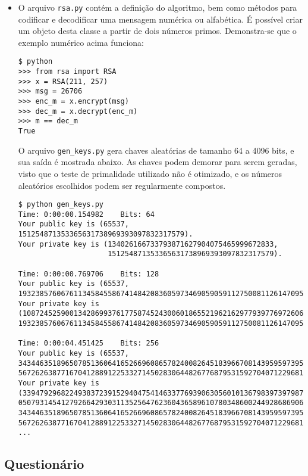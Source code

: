 \documentclass{article}
\begin{document}
\begin{itemize}
\item O arquivo \texttt{rsa.py} contém a definição do algoritmo, bem como
métodos para codificar e decodificar uma mensagem numérica ou alfabética. É
possível criar um objeto desta classe a partir de dois números primos.
Demonstra-se que o exemplo numérico acima funciona:
\begin{verbatim}
$ python
>>> from rsa import RSA
>>> x = RSA(211, 257)
>>> msg = 26706
>>> enc_m = x.encrypt(msg)
>>> dec_m = x.decrypt(enc_m)
>>> m == dec_m
True
\end{verbatim}
O arquivo \texttt{gen\_keys.py} gera chaves aleatórias de tamanho 64 a 4096
bits, e sua saída é mostrada abaixo. As chaves podem demorar para serem geradas,
visto que o teste de primalidade utilizado não é otimizado, e os números
aleatórios escolhidos podem ser regularmente compostos.
\begin{verbatim}
$ python gen_keys.py
Time: 0:00:00.154982    Bits: 64
Your public key is (65537, 151254871353365631738969393097832317579).
Your private key is (134026166733793871627904075465999672833,
                     151254871353365631738969393097832317579).

Time: 0:00:00.769706    Bits: 128
Your public key is (65537,
19323857606761134584558674148420836059734690590591127500811261470953459710357).
Your private key is
(10872452590013428699376177587452430060186552196216297793977697260690848668353,
19323857606761134584558674148420836059734690590591127500811261470953459710357).

Time: 0:00:04.451425    Bits: 256
Your public key is (65537,
3434463518965078513606416526696086578240082645183966708143959597395443093000469
567262638771670412889122533271450283064482677687953159270407122968119312127).
Your private key is
(339479296822493837239152940475414633776939063056010136798397397987818794825156
050793145412792664293031135256476236043658961078034860024492868690619730913,
3434463518965078513606416526696086578240082645183966708143959597395443093000469
567262638771670412889122533271450283064482677687953159270407122968119312127).
...
\end{verbatim}

\end{itemize}

\subsection*{Questionário}
\end{document}
